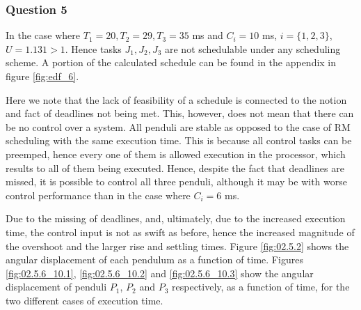 \subsubsection{Question 5}
In the case where $T_1 = 20, T_2 = 29, T_3 = 35$ ms and $C_i = 10$ ms,
$i=\{1,2,3\}$, $U=1.131 > 1$. Hence tasks $J_1, J_2, J_3$ are not schedulable
under any scheduling scheme. A portion of the calculated schedule can be found
in the appendix in figure \ref{fig:edf_6}.

Here we note that the lack of feasibility of a schedule is connected to the
notion and fact of deadlines not being met. This, however, does not mean that
there can be no control over a system. All penduli are stable as opposed to the
case of RM scheduling with the same execution time. This is because all control
tasks can be preemped, hence every one of them is allowed execution in the
processor, which results to all of them being executed. Hence, despite the fact
that deadlines are missed, it is possible to control all three penduli, although
it may be with worse control performance than in the case where $C_i = 6$ ms.

Due to the missing of deadlines, and, ultimately, due to the increased execution
time, the control input is not as swift as before, hence the increased magnitude
of the overshoot and the larger rise and settling times. Figure \ref{fig:02.5.2}
shows the angular displacement of each pendulum as a function of time.
Figures \ref{fig:02.5.6_10.1}, \ref{fig:02.5.6_10.2} and \ref{fig:02.5.6_10.3}
show the angular displacement of penduli $P_1$, $P_2$ and $P_3$ respectively, as
a function of time, for the two different cases of execution time.

\noindent{}

